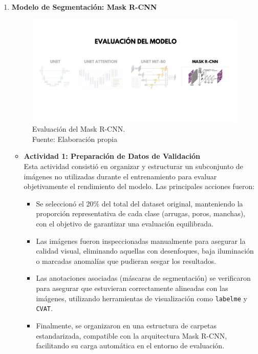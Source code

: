 \begin{enumerate}
\begin{itemize}
  \end{itemize}


  \item \textbf{Modelo de Segmentación: Mask R-CNN}
  \begin{figure}[H]
	\begin{center}
		\includegraphics[width=1\textwidth]{4/figures/evmask.png}
		\caption[Evaluación del Mask R-CNN]{Evaluación del Mask R-CNN.\\
		Fuente: Elaboración propia}
		\label{4:figevmask}
	\end{center}
\end{figure}
  \begin{itemize}
  
    \item \textbf{Actividad 1: Preparación de Datos de Validación} \\
    Esta actividad consistió en organizar y estructurar un subconjunto de imágenes no utilizadas durante el entrenamiento para evaluar objetivamente el rendimiento del modelo. Las principales acciones fueron:
    \begin{itemize}
      \item Se seleccionó el 20\% del total del dataset original, manteniendo la proporción representativa de cada clase (arrugas, poros, manchas), con el objetivo de garantizar una evaluación equilibrada.
      \item Las imágenes fueron inspeccionadas manualmente para asegurar la calidad visual, eliminando aquellas con desenfoques, baja iluminación o marcadas anomalías que pudieran sesgar los resultados.
      \item Las anotaciones asociadas (máscaras de segmentación) se verificaron para asegurar que estuvieran correctamente alineadas con las imágenes, utilizando herramientas de visualización como \texttt{labelme} y \texttt{CVAT}.
      \item Finalmente, se organizaron en una estructura de carpetas estandarizada, compatible con la arquitectura Mask R-CNN, facilitando su carga automática en el entorno de evaluación.
    \end{itemize}
  

\end{itemize}
\end{enumerate}
